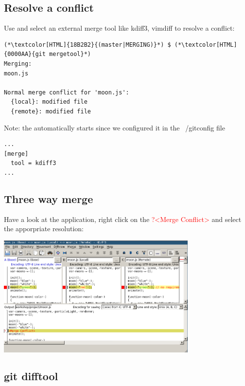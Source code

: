\subsection{Resolve a conflict}
\begin{frame}[fragile]
    \subslidetitle
  Use  and select an external merge tool like kdiff3, vimdiff to resolve a conflict:

  \begin{lstlisting}
(*\textcolor[HTML]{18B2B2}{(master|MERGING)}*) $ (*\textcolor[HTML]{0000AA}{git mergetool}*)
Merging:
moon.js

Normal merge conflict for 'moon.js':
  {local}: modified file
  {remote}: modified file
\end{lstlisting}

  Note: the  automatically starts since we configured it in the ~/gitconfig file
  \begin{lstlisting}
...
[merge]
  tool = kdiff3
...
\end{lstlisting}
\end{frame}

\subsection{Three way merge}
\begin{frame}[fragile]
    \subslidetitle
  Have a look at the  application, right click on the \textcolor{red}{?<Merge Conflict>} and select the apporpriate resolution:
  \newline \vspace{1em}
  \centerline{\includegraphics[width=10cm]{../screen/git-mergetool-kdiff3.png}}

\end{frame}

\subsection{git difftool}
\begin{frame}[fragile]
    \subslidetitle
\end{frame}

